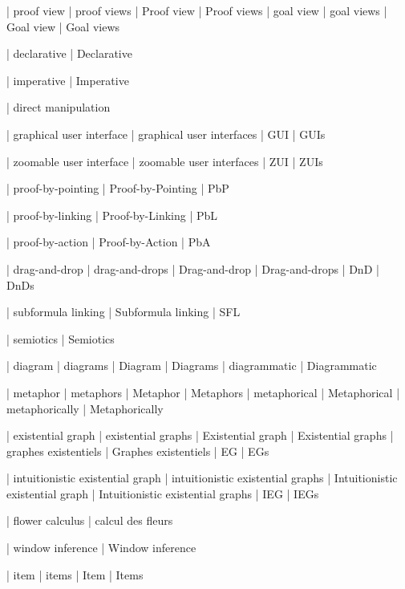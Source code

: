  | proof view
 | proof views
 | Proof view
 | Proof views
 | goal view
 | goal views
 | Goal view
 | Goal views

 | declarative
 | Declarative

 | imperative
 | Imperative

 | direct manipulation

 | graphical user interface
 | graphical user interfaces
 | GUI
 | GUIs

 | zoomable user interface
 | zoomable user interfaces
 | ZUI
 | ZUIs

 | proof-by-pointing
 | Proof-by-Pointing
 | PbP

 | proof-by-linking
 | Proof-by-Linking
 | PbL

 | proof-by-action
 | Proof-by-Action
 | PbA

 | drag-and-drop
 | drag-and-drops
 | Drag-and-drop
 | Drag-and-drops
 | DnD
 | DnDs

 | subformula linking
 | Subformula linking
 | SFL

 | semiotics
 | Semiotics

 | diagram
 | diagrams
 | Diagram
 | Diagrams
 | diagrammatic
 | Diagrammatic

 | metaphor
 | metaphors
 | Metaphor
 | Metaphors
 | metaphorical
 | Metaphorical
 | metaphorically
 | Metaphorically

 | existential graph
 | existential graphs
 | Existential graph
 | Existential graphs
 | graphes existentiels
 | Graphes existentiels
 | EG
 | EGs

 | intuitionistic existential graph
 | intuitionistic existential graphs
 | Intuitionistic existential graph
 | Intuitionistic existential graphs
 | IEG
 | IEGs

 | flower calculus
 | calcul des fleurs
 
 | window inference
 | Window inference


 | item
 | items
 | Item
 | Items

